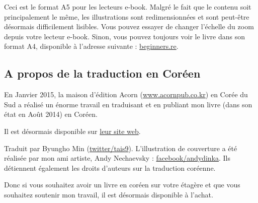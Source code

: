 



\ifdefined\ebook
Ceci est le format A5 pour les lecteurs e-book.
Malgré le fait que le contenu soit principalement le même, les illustrations sont redimensionnées et sont peut-être désormais difficilement lisibles.
Vous pouvez essayer de changer l'échelle du zoom depuis votre lecteur e-book.
Sinon, vous pouvez toujours voir le livre dans son format A4, disponible à l'adresse suivante :
\href{http://go.yurichev.com/17009}{beginners.re}.
\fi

\subsection*{A propos de la traduction en Coréen}

En Janvier 2015, la maison d'édition Acorn (\href{http://www.acornpub.co.kr}{www.acornpub.co.kr}) en Corée du Sud a réalisé un énorme travail en traduisant et en publiant mon livre (dans son état en Août 2014) en Coréen.

Il est désormais disponible sur \href{http://go.yurichev.com/17343}{leur site web}.

\iffalse
\begin{figure}[H]
\centering
\texttt{[image: acorn\_cover.jpg]}
\end{figure}
\fi

Traduit par Byungho Min (\href{http://go.yurichev.com/17344}{twitter/tais9}).
L'illustration de couverture a été réalisée par mon ami artiste, Andy Nechaevsky :
\href{http://go.yurichev.com/17023}{facebook/andydinka}.
Ils détiennent également les droits d'auteurs sur la traduction coréenne.

Donc si vous souhaitez avoir un livre  en coréen sur votre étagère et que vous souhaitez soutenir mon travail, il est désormais disponible à l'achat.

